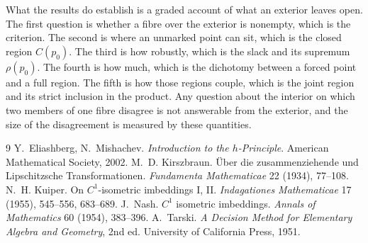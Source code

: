 \documentclass[11pt]{article}
\theoremstyle{definition}
\theoremstyle{remark}
\begin{document}
What the results do establish is a graded account of what an exterior leaves open. The first question is whether a fibre over the exterior is nonempty, which is the criterion. The second is where an unmarked point can sit, which is the closed region $C(p_0)$. The third is how robustly, which is the slack and its supremum $\rho(p_0)$. The fourth is how much, which is the dichotomy between a forced point and a full region. The fifth is how those regions couple, which is the joint region and its strict inclusion in the product. Any question about the interior on which two members of one fibre disagree is not answerable from the exterior, and the size of the disagreement is measured by these quantities.

\begin{thebibliography}{9}
 Y.~Eliashberg, N.~Mishachev. \emph{Introduction to the $h$-Principle}. American Mathematical Society, 2002.
 M.~D. Kirszbraun. \"{U}ber die zusammenziehende und Lipschitzsche Transformationen. \emph{Fundamenta Mathematicae} 22 (1934), 77--108.
 N.~H. Kuiper. On $C^1$-isometric imbeddings I, II. \emph{Indagationes Mathematicae} 17 (1955), 545--556, 683--689.
 J.~Nash. $C^1$ isometric imbeddings. \emph{Annals of Mathematics} 60 (1954), 383--396.
 A.~Tarski. \emph{A Decision Method for Elementary Algebra and Geometry}, 2nd ed. University of California Press, 1951.
\end{thebibliography}
\end{document}
